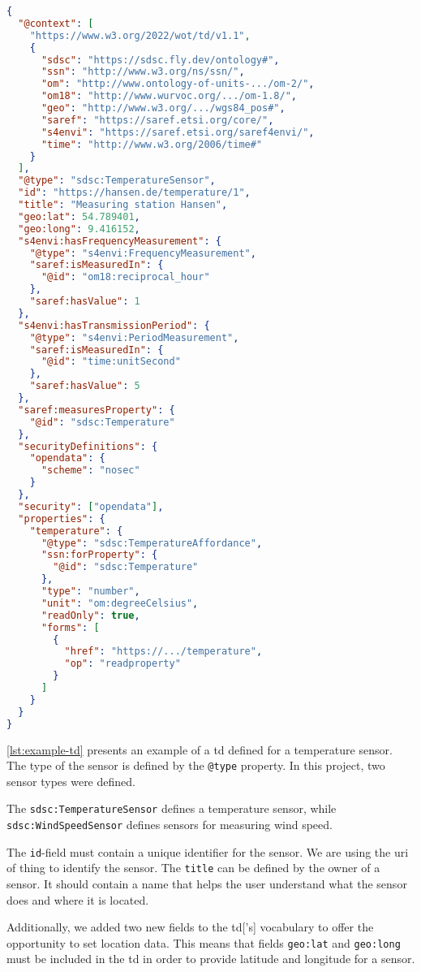 \begin{lstlisting}[language=json,caption={Example for a \gls{td}},label={lst:example-td}]
{
  "@context": [
    "https://www.w3.org/2022/wot/td/v1.1",
    {
      "sdsc": "https://sdsc.fly.dev/ontology#",
      "ssn": "http://www.w3.org/ns/ssn/",
      "om": "http://www.ontology-of-units-.../om-2/",
      "om18": "http://www.wurvoc.org/.../om-1.8/",
      "geo": "http://www.w3.org/.../wgs84_pos#",
      "saref": "https://saref.etsi.org/core/",
      "s4envi": "https://saref.etsi.org/saref4envi/",
      "time": "http://www.w3.org/2006/time#"
    }
  ],
  "@type": "sdsc:TemperatureSensor",
  "id": "https://hansen.de/temperature/1",
  "title": "Measuring station Hansen",
  "geo:lat": 54.789401,
  "geo:long": 9.416152,
  "s4envi:hasFrequencyMeasurement": {
    "@type": "s4envi:FrequencyMeasurement",
    "saref:isMeasuredIn": {
      "@id": "om18:reciprocal_hour"
    },
    "saref:hasValue": 1
  },
  "s4envi:hasTransmissionPeriod": {
    "@type": "s4envi:PeriodMeasurement",
    "saref:isMeasuredIn": {
      "@id": "time:unitSecond"
    },
    "saref:hasValue": 5
  },
  "saref:measuresProperty": {
    "@id": "sdsc:Temperature"
  },
  "securityDefinitions": {
    "opendata": {
      "scheme": "nosec"
    }
  },
  "security": ["opendata"],
  "properties": {
    "temperature": {
      "@type": "sdsc:TemperatureAffordance",
      "ssn:forProperty": {
        "@id": "sdsc:Temperature"
      },
      "type": "number",
      "unit": "om:degreeCelsius",
      "readOnly": true,
      "forms": [
        {
          "href": "https://.../temperature",
          "op": "readproperty"
        }
      ]
    }
  }
}
\end{lstlisting}

\autoref{lst:example-td} presents an example of a \gls{td} defined for a temperature sensor. The type of the sensor is defined by the \lstinline|@type| property. In this project, two sensor types were defined.

The \lstinline|sdsc:TemperatureSensor| defines a temperature sensor, while \lstinline|sdsc:WindSpeedSensor| defines sensors for measuring wind speed.

The \lstinline|id|-field must contain a unique identifier for the sensor. We are using the \gls{uri} of thing to identify the sensor. The \lstinline|title| can be defined by the owner of a sensor. It should contain a name that helps the user understand what the sensor does and where it is located.

Additionally, we added two new fields to the \gls{td}['s] vocabulary to offer the opportunity to set location data. This means that fields \lstinline|geo:lat| and \lstinline|geo:long| must be included in the \gls{td} in order to provide latitude and longitude for a sensor.


